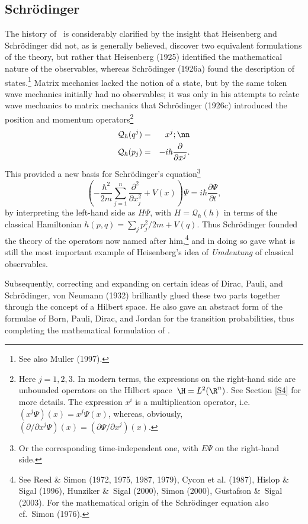 \documentclass[12pt,titlepage]{article}
\newcommand{\beq}{\begin{equation}}
\newcommand{\eeq}{\end{equation}}
\newcommand{\Hs}{Hilbert space} \newcommand{\Bs}{Banach space}
\newcommand{\qh}{q_{\hbar}} \newcommand{\sgh}{\sigma_{\hbar}}
\newcommand{\CQ}{{\mathcal Q}} \newcommand{\CR}{{\mathcal R}}
\renewcommand{\qh}{\CQ_{\hbar}}
\begin{document}
\subsection{Schr\"{o}dinger} \label{Ssection}
The history of \qm\ is considerably clarified by the insight that Heisenberg  and Schr\"{o}dinger  did not, as is generally believed, discover two equivalent formulations of the theory, but rather that Heisenberg (1925) identified the mathematical nature of the observables, whereas Schr\"{o}dinger (1926a) found the description of states.\footnote{See also Muller (1997).} Matrix mechanics lacked the notion of a state, but by the same token wave mechanics initially had no observables; it was only in his attempts to relate wave mechanics to matrix mechanics that Schr\"{o}dinger (1926c) introduced the position and momentum operators\footnote{Here $j=1,2,3$. In modern terms, the expressions on the right-hand side are unbounded operators on the \Hs\ $\H=L^2(\R^n)$. See Section \ref{S4} for more details. The expression $x^i$ is a multiplication operator, i.e.\ $(x^j\Psi)(x)=x^j\Psi(x)$, whereas, obviously, $(\partial/\partial x^j \Psi)(x)=
(\partial\Psi/\partial x^j)(x)$.}
\begin{eqnarray}
\qh(q^j) & =& x^j; \nn \\ \qh(p_j) & =& -i\hbar \frac{\partial}{\partial x^j}.\label{SOP}
\end{eqnarray}
This provided a new basis for Schr\"{o}dinger's equation\footnote{Or the corresponding time-independent one, with $E\Psi$ on the right-hand side.}
\beq \left(-\frac{\hbar^2}{2m}\sum_{j=1}^n \frac{\partial^2}{\partial x_j^2} +V(x)\right)\Psi=i\hbar \frac{\partial\Psi}{\partial t},\label{Schreq}\eeq
by interpreting the left-hand side as $H\Psi$, with $H=\qh(h)$ in terms of the classical Hamiltonian $h(p,q)=\sum_j p_j^2/2m +V(q)$. Thus  Schr\"{o}dinger founded the theory of the operators now named after him,\footnote{\label{SOPrefs} See Reed \& Simon (1972, 1975, 1987, 1979), Cycon et al. (1987), Hislop \& Sigal (1996),  Hunziker \&\ Sigal (2000), Simon (2000),  Gustafson \&\ Sigal (2003).
For the mathematical origin of the Schr\"{o}dinger equation also cf.\ Simon (1976).
} and in doing so gave what is still the most important example of Heisenberg's idea of {\it Umdeutung} of classical observables. 

Subsequently, correcting and expanding on certain  ideas of Dirac, Pauli, and  Schr\"{o}dinger, von Neumann (1932) brilliantly glued these two parts together through the concept of a \Hs. He also gave an abstract form of the formulae of Born, Pauli,  Dirac, and Jordan for the transition probabilities, thus completing the mathematical formulation of \qm. 
\end{document}
